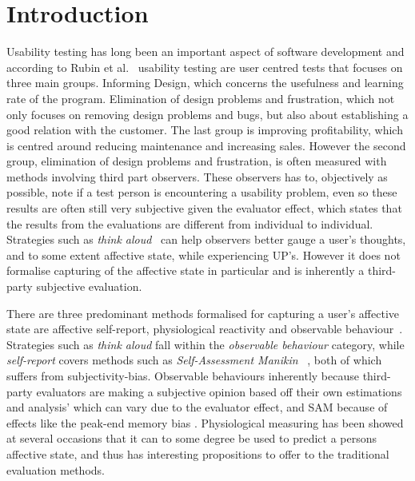 \section{Introduction}


Usability testing has long been an important aspect of software development and according to Rubin et al.~\cite{rubin2008handbook} usability testing are user centred tests that focuses on three main groups.
Informing Design, which concerns the usefulness and learning rate of the program.
Elimination of design problems and frustration, which not only focuses on removing design problems and bugs, but also about establishing a good relation with the customer.
The last group is improving profitability, which is centred around reducing maintenance and increasing sales.
However the second group, elimination of design problems and frustration, is often measured with methods involving third part observers.
These observers has to, objectively as possible, note if a test person is encountering a usability problem, even so these results are often still very subjective given the evaluator effect\cite{eval_effect}, which states that the results from the evaluations are different from individual to individual.
Strategies such as \textit{think aloud}~\cite{use_of_TA_and_IDA} can help observers better gauge a user's
thoughts, and to some extent affective state, while experiencing UP's. However it does
not formalise capturing of the affective state in particular and is inherently a third-party
subjective evaluation. 

There are three predominant methods formalised for capturing a user's affective state are affective self-report, physiological reactivity and
observable behaviour~\cite{BRADLEY199449}. Strategies such as \textit{think
aloud} fall within the \textit{observable behaviour} category, while
\textit{self-report} covers methods such as \textit{Self-Assessment Manikin}
~\cite{BRADLEY199449}, both of which suffers from subjectivity-bias. 
Observable behaviours inherently because third-party evaluators are making a subjective opinion based off their own estimations and analysis' which can vary due to the evaluator effect, and SAM because of effects like the peak-end memory bias \cite{cockburn_peakend}.
Physiological measuring has been showed at several occasions that it can to some degree be used to predict a persons affective state, and thus has interesting propositions to offer to the traditional evaluation methods.


